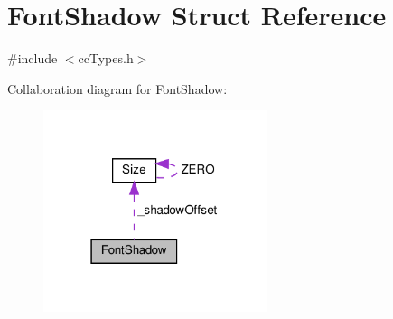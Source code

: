 \hypertarget{structFontShadow}{}\section{Font\+Shadow Struct Reference}
\label{structFontShadow}


{\ttfamily \#include $<$cc\+Types.\+h$>$}



Collaboration diagram for Font\+Shadow\+:
\nopagebreak
\begin{figure}[H]
\begin{center}
\leavevmode
\includegraphics[width=186pt]{structFontShadow__coll__graph}
\end{center}
\end{figure}
